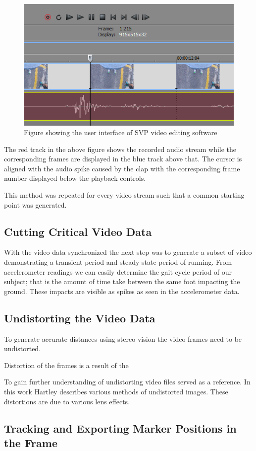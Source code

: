 \begin{figure}[!ht]
\centering
  \includegraphics[width=0.5\linewidth]{figures/svpframe.png}
  \caption{Figure showing the user interface of SVP video editing software}
  \label{fig:svpframe}
\end{figure}

The red track in the above figure shows the recorded audio stream while the corresponding frames are displayed in the blue track above that. The cursor is aligned with the audio spike caused by the clap with the corresponding frame number displayed below the playback controls.

This method was repeated for every video stream such that a common starting point was generated. 

\subsection{Cutting Critical Video Data}
With the video data synchronized the next step was to generate a subset of video demonstrating a transient period and steady state period of running. From accelerometer readings we can easily determine the gait cycle period of our subject; that is the amount of time take between the same foot impacting the ground. These impacts are visible as spikes as seen in the accelerometer data.  

\subsection{Undistorting the Video Data}
To generate accurate distances using stereo vision the video frames need to be undistorted.

Distortion of the frames is a result of the 

To gain further understanding of undistorting video files \cite{Hartley2004} served as a reference. In this work Hartley describes various methods of undistorted images. These distortions are due to various lens effects.

\subsection{Tracking and Exporting Marker Positions in the Frame}

